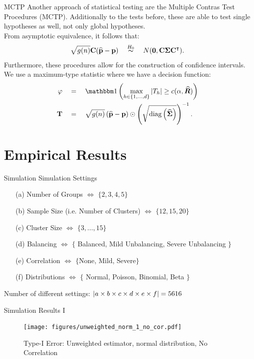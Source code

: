 \documentclass[xcolor=dvipsnames, aspectratio = 169]{beamer}
\begin{document}
\begin{frame}[fragile]{MCTP}
Another approach of statistical testing are the Multiple Contras Test Procedures (MCTP). Additionally to the tests before, these are able to test single hypotheses as well, not only global hypotheses.\\
From asymptotic equivalence, it follows that:
\begin{equation*}
	\sqrt{g(n)}\mathbf{C}(\widehat{\mathbf{p}} - \mathbf{p}) \quad \stackrel{H_0}{\thicksim} \quad  N(\mathbf{0}, \mathbf{C}\bm{\Sigma}\mathbf{C}^{\intercal}).
\end{equation*}
Furthermore, these procedures allow for the construction of confidence intervals. We use a maximum-type statistic where we have a decision function:
\begin{align*}
	\varphi \quad &= \quad \ind{\max_{h\in\{1,...,d\}} \abs{T_h} \geq c(\alpha, \widehat{\bm{R}})} \\
	\vc{T} \quad &= \quad \sqrt{g(n)}\left(\widehat{\vc{p}} - \vc{p}\right) \odot \left(\sqrt{\diag{\bm{\widehat{\Sigma}}}}\right)^{-1}.
\end{align*}
\end{frame}

\section{Empirical Results}
\begin{frame}{Simulation}
Simulation Settings
\begin{enumerate}
	\item[(a)] Number of Groups $\Leftrightarrow$ $\{2,3, 4, 5\}$
	\item[(b)] Sample Size (i.e. Number of Clusters) $\Leftrightarrow$ $\{12, 15, 20\}$
	\item[(c)] Cluster Size $\Leftrightarrow$ $\{3, ..., 15\}$
	\item[(d)] Balancing $\Leftrightarrow$ $\{$ Balanced, Mild Unbalancing, Severe Unbalancing $\}$
	\item[(e)] Correlation $\Leftrightarrow$ $\{$None, Mild, Severe$\}$
	\item[(f)] Distributions $\Leftrightarrow$ $\{$ Normal, Poisson, Binomial, Beta $\}$
\end{enumerate}
Number of different settings: $\left\lvert a \times b \times c \times d \times e \times f \right\rvert = 5616$

\end{frame}

\begin{frame}{Simulation Results I}
\begin{figure}
	\texttt{[image: figures/unweighted\_norm\_1\_no\_cor.pdf]}
	\caption{Type-I Error: Unweighted estimator, normal distribution, No Correlation}
\end{figure}
\end{frame}
\end{document}
